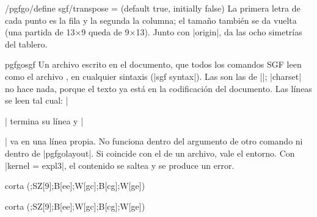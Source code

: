 \begin{key}{/pgfgo/define sgf/transpose =  (default true, initially false)}
	La primera letra de cada punto es la fila y la segunda la columna; el tamaño también se da vuelta (una partida de 13$\times$9 queda de 9$\times$13). Junto con |origin|, da las ocho simetrías del tablero.

	\begin{codeexample}[]

		\begin{goban}[sgf size = espejo, scale = 0.4]
		\end{goban}
		\begin{goban}[sgf size = traspuesta, scale = 0.4]
		\end{goban}
	\end{codeexample}
\end{key}

\begin{environment}{{pgfgosgf}}
	Un archivo escrito en el documento, que todos los comandos SGF leen como el archivo , en cualquier sintaxis (|sgf syntax|). Las  son las de |\pgfgodefinesgf|; |charset| no hace nada, porque el texto ya está en la codificación del documento. Las líneas se leen tal cual: |\begin{pgfgosgf}| termina su línea y |\end{pgfgosgf}| va en una línea propia. No funciona dentro del argumento de otro comando ni dentro de |pgfgolayout|. Si  coincide con el de un archivo, vale el entorno. Con |kernel = expl3|, el contenido se saltea y se produce un error.

	\begin{codeexample}
\begin{pgfgosgf}{corta}
(;SZ[9];B[ee];W[gc];B[cg];W[ge])
\end{pgfgosgf}

\begin{goban}[sgf size = corta, scale = 0.4]
\end{goban}
	\end{codeexample}

\begin{pgfgosgf}{corta}
(;SZ[9];B[ee];W[gc];B[cg];W[ge])
\end{pgfgosgf}

\begin{goban}[sgf size = corta, scale = 0.4]
\end{goban}
\end{environment}

